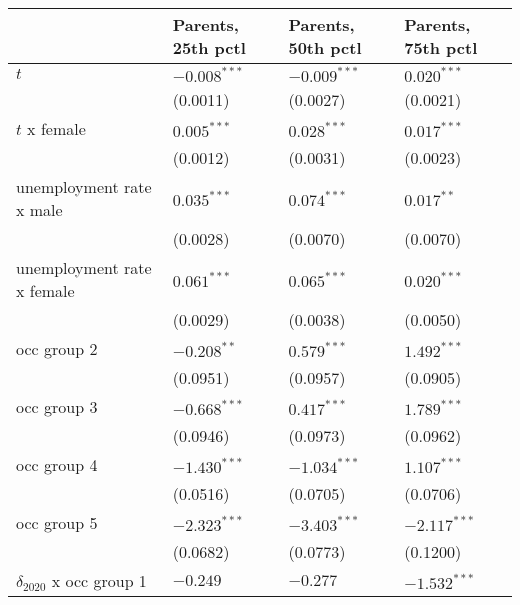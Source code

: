 \begin{tabular}{llll}
\toprule
{} & Parents, 25th pctl & Parents, 50th pctl & Parents, 75th pctl \\
\midrule
$t$                                    &     $-0.008^{***}$ &     $-0.009^{***}$ &      $0.020^{***}$ \\
                                       &           (0.0011) &           (0.0027) &           (0.0021) \\
$t$ x female                           &      $0.005^{***}$ &      $0.028^{***}$ &      $0.017^{***}$ \\
                                       &           (0.0012) &           (0.0031) &           (0.0023) \\
unemployment rate x male               &      $0.035^{***}$ &      $0.074^{***}$ &       $0.017^{**}$ \\
                                       &           (0.0028) &           (0.0070) &           (0.0070) \\
unemployment rate x female             &      $0.061^{***}$ &      $0.065^{***}$ &      $0.020^{***}$ \\
                                       &           (0.0029) &           (0.0038) &           (0.0050) \\
occ group 2                            &      $-0.208^{**}$ &      $0.579^{***}$ &      $1.492^{***}$ \\
                                       &           (0.0951) &           (0.0957) &           (0.0905) \\
occ group 3                            &     $-0.668^{***}$ &      $0.417^{***}$ &      $1.789^{***}$ \\
                                       &           (0.0946) &           (0.0973) &           (0.0962) \\
occ group 4                            &     $-1.430^{***}$ &     $-1.034^{***}$ &      $1.107^{***}$ \\
                                       &           (0.0516) &           (0.0705) &           (0.0706) \\
occ group 5                            &     $-2.323^{***}$ &     $-3.403^{***}$ &     $-2.117^{***}$ \\
                                       &           (0.0682) &           (0.0773) &           (0.1200) \\
$\delta_{2020}$ x occ group 1          &           $-0.249$ &           $-0.277$ &     $-1.532^{***}$ \\

\end{tabular}
